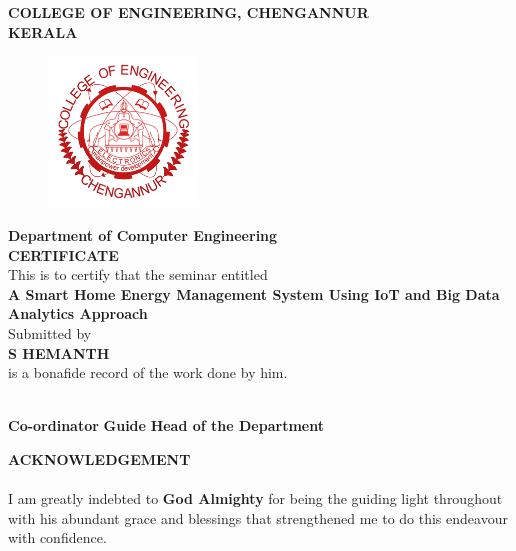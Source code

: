 \documentclass[a4paper,12pt,oneside]{article}
\begin{document}
\newpage
\thispagestyle{empty}
\begin{center}
\setlength{\baselineskip}{1.5\baselineskip}
{\large\textbf{COLLEGE OF ENGINEERING, CHENGANNUR}}
\\
{\large\textbf{KERALA}}
\\
\begin{figure}[H]
\centering
\includegraphics[width=4cm]{ceclogo.png}
\end{figure}
\setlength{\baselineskip}{1.5\baselineskip}
\textbf{Department of Computer Engineering}
\\
\textbf{CERTIFICATE}
\\
This is to certify that the seminar entitled
\\
\textbf{A Smart Home Energy Management System
Using IoT and Big Data Analytics Approach}
\\
Submitted by
\\
\textbf{S HEMANTH}
\\
is a bonafide record of the work done by him.
\end{center}
\vspace{20ex}
\hspace{5ex}
\hspace{15ex}
\hspace{16ex}
\\
\vspace{0ex}
\hspace{4ex}
\textbf{Co-ordinator}
\hspace{20ex}
\textbf{Guide}
\hspace{16ex}
\textbf{Head of the Department} 
\newpage
{}
\renewcommand{\headrulewidth}{0.0pt}
\renewcommand{\footrulewidth}{0.0pt}
\begin{center}
\large{\textbf{ACKNOWLEDGEMENT}}
\end{center}
\vspace{6ex}
\setlength{\baselineskip}{1.5\baselineskip}
\paragraph{}
I am greatly indebted to \textbf{God Almighty} for being the guiding light throughout with his
abundant grace and blessings that strengthened me to do this endeavour with confidence.
\end{document}
